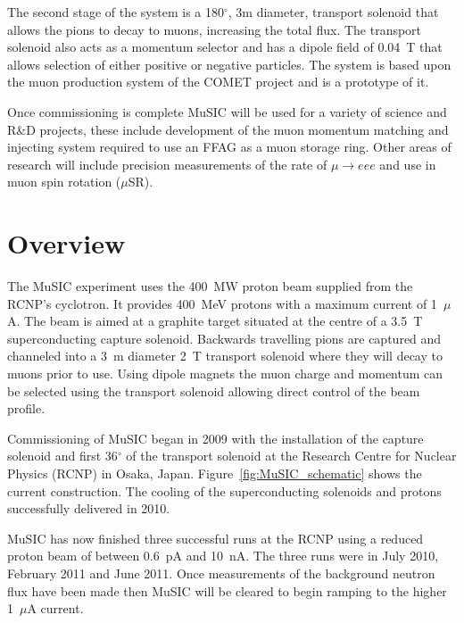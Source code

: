 \documentclass[a4paper]{jpconf}
\begin{document}
The second stage of the system is a 180$^{\circ}$, 3m diameter, transport solenoid that allows the pions to decay to muons, increasing the total flux. The transport solenoid also acts as a momentum selector and has a dipole field of 0.04~T that allows selection of either positive or negative particles. The system is based upon the muon production system of the COMET project and is a prototype of it. 

Once commissioning is complete MuSIC will be used for a variety of science and R\&D projects, these include development of the muon momentum matching and injecting system required to use an FFAG as a muon storage ring. Other areas of research will include precision measurements of the rate of $\mu \rightarrow eee$ and use in muon spin rotation ($\mu$SR).

\section{Overview}
The MuSIC experiment uses the 400~MW proton beam supplied from the RCNP's cyclotron. It provides 400~MeV protons with a maximum current of 1~$\mu$A. The beam is aimed at a graphite target situated at the centre of a 3.5~T superconducting capture solenoid. Backwards travelling pions are captured and channeled into a 3~m diameter 2~T transport solenoid where they will decay to muons prior to use. Using dipole magnets the muon charge and momentum can be selected using the transport solenoid allowing direct control of the beam profile.

Commissioning of MuSIC began in 2009 with the installation of the capture solenoid and first 36$^{\circ}$ of the transport solenoid at the Research Centre for Nuclear Physics (RCNP) in Osaka, Japan. Figure~\ref{fig:MuSIC_schematic} shows the current construction. The cooling of the superconducting solenoids and protons successfully delivered in 2010. 

MuSIC has now finished three successful runs at the RCNP using a reduced proton beam of between 0.6~pA and 10~nA. The three runs were in July 2010, February 2011 and June 2011. Once measurements of the background neutron flux have been made then MuSIC will be cleared to begin ramping to the higher 1~$\mu$A current.    
\end{document}
